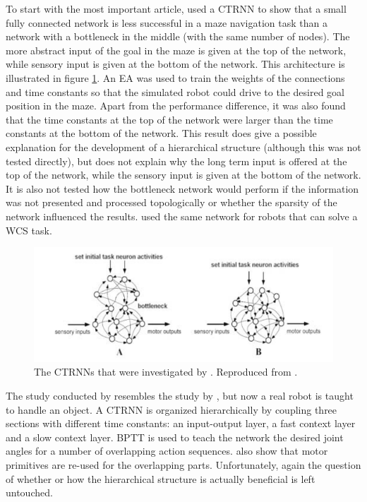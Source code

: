 \documentclass[10pt,a4paper]{report}
\begin{document}
To start with the most important article, \citet{Paine2005} used a CTRNN to show that a small fully connected network is less successful in a maze navigation task than a network with a bottleneck in the middle (with the same number of nodes). The more abstract input of the goal in the maze is given at the top of the network, while sensory input is given at the bottom of the network. This architecture is illustrated in figure \ref{tani}. An EA was used to train the weights of the connections and time constants so that the simulated robot could drive to the desired goal position in the maze. Apart from the performance difference, it was also found that the time constants at the top of the network were larger than the time constants at the bottom of the network. This result does give a possible explanation for the development of a hierarchical structure (although this was not tested directly), but does not explain why the long term input is offered at the top of the network, while the sensory input is given at the bottom of the network. It is also not tested how the bottleneck network would perform if the information was not presented and processed topologically or whether the sparsity of the network influenced the results. \citet{Maniadakis2010} used the same network for robots that can solve a WCS task. 

\begin{figure}[tbhp]
\begin{center}
\includegraphics[width=\textwidth]{figures/tani.png}
\caption{The CTRNNs that were investigated by \citet{Paine2005}. Reproduced from \citet{Paine2005}.}
\label{tani}
\end{center}
\end{figure}

The study conducted by \citet{Yamashita2008} resembles the study by \citet{Botvinick2007}, but now a real robot is taught to handle an object. A CTRNN is organized hierarchically by coupling three sections with different time constants: an input-output layer, a fast context layer and a slow context layer. BPTT is used to teach the network the desired joint angles for a number of overlapping action sequences. \citet{Yamashita2008} also show that motor primitives are re-used for the overlapping parts. Unfortunately, again the question of whether or how the hierarchical structure is actually beneficial is left untouched. 
\end{document}
